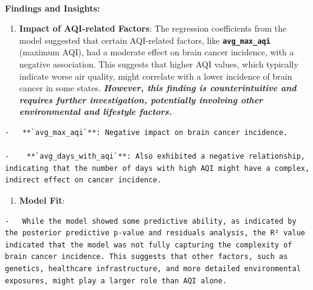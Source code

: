\documentclass[
  12pt,
]{article}
\makeatletter
\let\oldparagraph\paragraph
\renewcommand{\paragraph}{
    \@ifstar
      \xxxParagraphStar
      \xxxParagraphNoStar
  }
\newcommand{\xxxParagraphStar}[1]{\oldparagraph*{#1}\mbox{}}
\newcommand{\xxxParagraphNoStar}[1]{\oldparagraph{#1}\mbox{}}
\providecommand{\tightlist}{%
  \setlength{\itemsep}{0pt}\setlength{\parskip}{0pt}}\usepackage{longtable,booktabs,array}
\makeatother
\begin{document}
\paragraph{\texorpdfstring{\textbf{Findings and
Insights:}}{Findings and Insights:}}\label{findings-and-insights}

\begin{enumerate}
\def\labelenumi{\arabic{enumi}.}
\tightlist
\item
  \textbf{Impact of AQI-related Factors}: The regression coefficients
  from the model suggested that certain AQI-related factors, like
  \textbf{\texttt{avg\_max\_aqi}} (maximum AQI), had a moderate effect
  on brain cancer incidence, with a negative association. This suggests
  that higher AQI values, which typically indicate worse air quality,
  might correlate with a lower incidence of brain cancer in some states.
  \textbf{\emph{However, this finding is counterintuitive and requires
  further investigation, potentially involving other environmental and
  lifestyle factors.}}
\end{enumerate}

\begin{verbatim}
-   **`avg_max_aqi`**: Negative impact on brain cancer incidence.

-    **`avg_days_with_aqi`**: Also exhibited a negative relationship, indicating that the number of days with high AQI might have a complex, indirect effect on cancer incidence.
\end{verbatim}

\begin{enumerate}
\def\labelenumi{\arabic{enumi}.}
\setcounter{enumi}{1}
\tightlist
\item
  \textbf{Model Fit}:
\end{enumerate}

\begin{verbatim}
-   While the model showed some predictive ability, as indicated by the posterior predictive p-value and residuals analysis, the R² value indicated that the model was not fully capturing the complexity of brain cancer incidence. This suggests that other factors, such as genetics, healthcare infrastructure, and more detailed environmental exposures, might play a larger role than AQI alone.
\end{verbatim}
\end{document}
